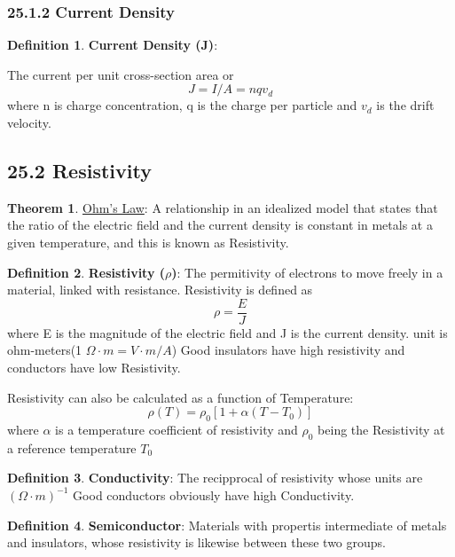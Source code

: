 \documentclass[12pt]{amsart}
\theoremstyle{definition}
\newtheorem{theorem}{Theorem}  %
\newtheorem{definition}{Definition} %
\numberwithin{equation}{theorem}    %
\begin{document}
\subsubsection*{25.1.2 Current Density}

\begin{definition}
    \textbf{Current Density (J)}:

   The current per unit cross-section area or $$J = I/A = nqv_d$$ where n is charge concentration, 
   q is the charge per particle and $v_d$ is the drift velocity.
\end{definition}

\subsection*{25.2 Resistivity}

\begin{theorem}
    \underline{Ohm's Law}:
    A relationship in an idealized model that states that the ratio of the electric
    field and the current density is constant in metals at a given temperature, and this is known
    as Resistivity.
\end{theorem}

\begin{definition}
    \textbf{Resistivity ($\rho$)}:
    The permitivity of electrons to move freely in a material, linked with resistance.
    Resistivity is defined as $$ \rho = \frac{E}{J}$$ where E is the magnitude 
    of the electric field and J is the current density. unit is ohm-meters(1 $\Omega \cdot m =V \cdot m/A$)
    Good insulators have high resistivity and conductors have low Resistivity.

    Resistivity can also be calculated as a function of Temperature:
    $$\rho(T) = \rho_0[1+\alpha(T-T_0)]$$ where $\alpha$ is a temperature 
    coefficient of resistivity and  $\rho_0$ being the Resistivity at a reference temperature $T_0$
\end{definition}

\begin{definition}
    \textbf{Conductivity}:
    The recipprocal of resistivity whose units are $(\Omega \cdot m)^{-1}$ Good conductors
    obviously have high Conductivity.
\end{definition}

\begin{definition}
    \textbf{Semiconductor}:
    Materials with propertis intermediate of metals and insulators, whose 
    resistivity is likewise between these two groups.
\end{definition}
\end{document}
